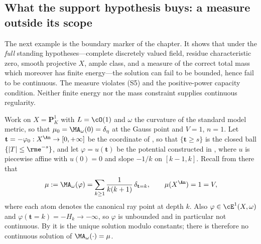 \subsection{What the support hypothesis buys: a measure outside its scope}
\label{sec:ch29-ex-boundary}

The next example is the boundary marker of the chapter.  It shows that under
the \emph{full} standing hypotheses---complete discretely valued field,
residue characteristic zero, smooth projective $X$, ample class, and a
measure of the correct total mass which moreover has finite energy---the
solution can fail to be bounded, hence fail to be continuous.  The measure violates \textup{(S5)} and the positive-power capacity
condition.  Neither finite energy nor the mass constraint supplies
continuous regularity.

\begin{example}
\label{ex:ch29-unbounded-not-supported}
Work on $X=\mathbf P^1_K$ with $L=\cO(1)$ and $\omega$ the curvature
of the standard model metric, so that $\mu_0=\MA_\omega(0)=\delta_\eta$ at
the Gauss point and $V=1$, $n=1$.  Let
$\mathbf t=-\varphi_0:X^{\An}\to[0,+\infty]$ be the coordinate of
, so that $\{\mathbf t\geq s\}$ is the
closed ball $\{|T|\leq\rme^{-s}\}$, and let $\varphi=u(\mathbf t)$ be
the potential constructed in , where
$u$ is piecewise affine with $u(0)=0$ and slope $-1/k$ on
$[k-1,k]$.  Recall from there that
\begin{equation}
\label{eq:ch29-boundary-measure}
 \mu:=\MA_\omega(\varphi)
 =\sum_{k\geq1}\frac1{k(k+1)}\,\delta_{\mathbf t=k},
 \qquad \mu(X^{\An})=1=V,
\end{equation}
where each atom denotes the canonical ray point at depth $k$.
Also $\varphi\in\cE^1(X,\omega)$ and
$\varphi(\mathbf t=k)=-H_k\to-\infty$, so $\varphi$ is unbounded and in
particular not continuous.  By  it is the unique
solution modulo constants; there is therefore no continuous solution of
$\MA_\omega(\cdot)=\mu$.


\end{example}
